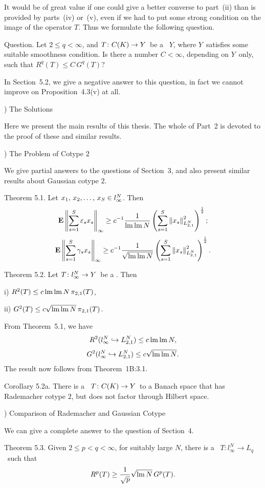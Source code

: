 It would be of great value if one could give a
better converse to part~(ii) than is provided by parts~(iv)
or~(v), even if we had to put some strong condition on the image
of the
operator $T$. Thus we formulate the following question.
 
\proclaim Question. Let $2\le q<\infty$, and $T\colon C(K)\to Y$\ be a \blotaBs\
$Y$, where
$Y$\ satisfies some suitable smoothness condition. Is there a number
$C<\infty$, depending on $Y$\ only, such that $R^q(T) \le C\, G^q(T)$?
 
In Section~5.2, we give a negative answer to this question, in fact
we cannot
improve on Proposition~4.3(v) at all.
 
\vfill
\eject
 
) The Solutions
 
Here we present the main results of this thesis. The whole of
Part~2 is devoted to the proof of these and similar results.
 
) The Problem of Cotype $2$
 
We give partial answers to the questions of Section~3, and also present
similar
results about Gaussian cotype $2$.
 
\proclaim Theorem 5.1. Let $\xS\in l_\infty^N$. Then
$$ {\bf E}\left\| \sum_{s=1}^S \varepsilon_s x_s \right\|_\infty \ge c^{-1} {1\over \mathop{\rm lm}\nolimits\mathop{\rm lm}\nolimits N} \left( \sum_{s=1}^S \left\| x_s \right\|_{L_{2,1}^N}^2 \right)^{1\over2} ;$$
$$ {\bf E}\left\| \sum_{s=1}^S \gamma_s x_s \right\|_\infty \ge c^{-1} {1\over \sqrt{\mathop{\rm lm}\nolimits\mathop{\rm lm}\nolimits N}} \left( \sum_{s=1}^S \left\| x_s \right\|_{L_{2,1}^N}^2 \right)^{1\over2} .$$
 
\proclaim Theorem 5.2. Let $T\colon l_\infty^N\to Y$\ be a \blotaBs. Then
\item{i)} $R^2(T) \le c \mathop{\rm lm}\nolimits\mathop{\rm lm}\nolimits N\, \pi_{2,1}(T)$,
\item{ii)} $G^2(T) \le c \sqrt{\mathop{\rm lm}\nolimits\mathop{\rm lm}\nolimits N}\, \pi_{2,1}(T)$.
 
\Proof From Theorem~5.1, we have
$$ R^2(l_\infty^N \hookrightarrow L_{2,1}^N) \le c \mathop{\rm lm}\nolimits\mathop{\rm lm}\nolimits N ,$$
$$ G^2(l_\infty^N \hookrightarrow L_{2,1}^N) \le c \sqrt{\mathop{\rm lm}\nolimits\mathop{\rm lm}\nolimits N}
.$$
The result now follows from Theorem~1B:3.1.
\endproof
 
\proclaim Corollary 5.2a. There is a \blo\ $T\colon C(K)\to Y$\ to a Banach space
that has
Rademacher cotype $2$, but does not factor through Hilbert space.
 
) Comparison of Rademacher and Gaussian Cotype
 
We can give a complete answer to the question of Section~4.
 
\proclaim Theorem 5.3. Given $2\le p<q<\infty$, for suitably large
$N$,
there is a \blo\ $T\colon l_\infty^N\to L_q$\ such that
$$ R^p(T) \ge {1\over\sqrt{p}} \sqrt{\mathop{\rm lm}\nolimits N}\, G^p(T) .$$
 
